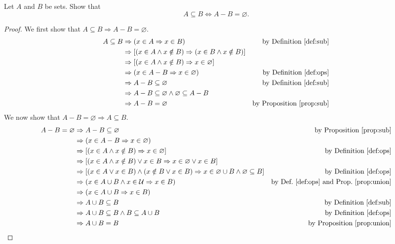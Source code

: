 \documentclass[../main.tex]{subfiles}
\begin{document}
\begin{ex}
    Let $A$ and $B$ be sets.
    Show that
    \[
        A \subseteq B \Leftrightarrow A - B = \varnothing.
    \]
\end{ex}
\begin{proof}
    We first show that $A \subseteq B \Rightarrow A - B = \varnothing$.
    \begin{align*}
        A \subseteq B &\Rightarrow (x \in A \Rightarrow x \in B) &\text{by Definition~\ref{def:sub}}\\
                      &\Rightarrow [(x \in A \wedge x \notin B) \Rightarrow (x \in B \wedge x \notin B)]\\
                      &\Rightarrow [(x \in A \wedge x \notin B) \Rightarrow x \in \varnothing]\\
                      &\Rightarrow (x \in A - B \Rightarrow x \in \varnothing) &\text{by Definition~\ref{def:ops}}\\
                      &\Rightarrow A - B \subseteq \varnothing &\text{by Definition~\ref{def:sub}} \\
                      &\Rightarrow A - B \subseteq \varnothing \wedge \varnothing \subseteq A - B\\
                      &\Rightarrow A - B = \varnothing &\text{by Proposition~\ref{prop:sub}}
    \end{align*}
    We now show that $A - B = \varnothing \Rightarrow A \subseteq B$.
    \begin{align*}
        A - B = \varnothing &\Rightarrow A - B \subseteq \varnothing &\text{by Proposition~\ref{prop:sub}}\\
                            &\Rightarrow (x \in A - B \Rightarrow x \in \varnothing)\\
                            &\Rightarrow [(x \in A \wedge x \notin B) \Rightarrow x \in \varnothing] &\text{by Definition~\ref{def:ops}}\\
                            &\Rightarrow [(x \in A \wedge x \notin B) \vee x \in B \Rightarrow x \in \varnothing \vee x \in B]\\
                            &\Rightarrow [(x \in A \vee x \in B) \wedge (x \notin B \vee x \in B) \Rightarrow x \in \varnothing \cup B \wedge \varnothing \subseteq B] &\text{by Definition~\ref{def:ops}}\\
                            &\Rightarrow (x \in A \cup B \wedge x \in \mathcal{U} \Rightarrow x \in B) &\text{by Def.~\ref{def:ops} and Prop.~\ref{prop:union}}\\
                            &\Rightarrow (x \in A \cup B \Rightarrow x \in B)\\
                            &\Rightarrow A \cup B \subseteq B &\text{by Definition~\ref{def:sub}}\\
                            &\Rightarrow A \cup B \subseteq B \wedge B \subseteq A \cup B &\text{by Definition~\ref{def:ops}}\\
                            &\Rightarrow A \cup B = B &\text{by Proposition~\ref{prop:union}}
    \end{align*}
\end{proof}
\end{document}

